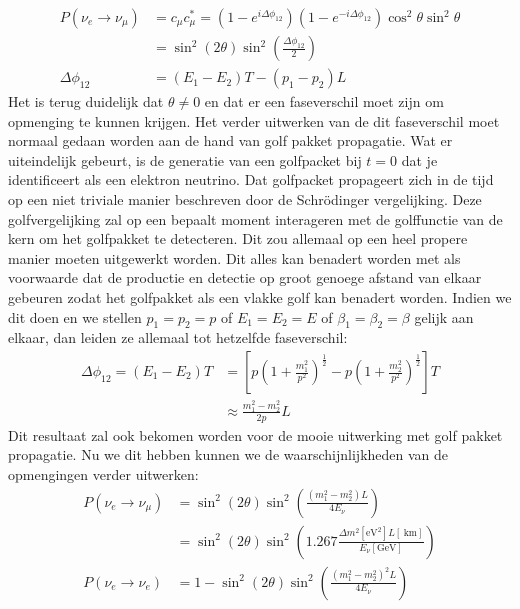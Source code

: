 \documentclass[../main.tex]{subfiles}
\begin{document}
\begin{equation}
    \begin{aligned}
        \label{eq:neutrino_2_oscilaties_5}
        P\left(\nu_{e} \rightarrow \nu_{\mu}\right) &=c_{\mu} c_{\mu}^{*}=\left(1-e^{i \Delta \phi_{12}}\right)\left(1-e^{-i \Delta \phi_{12}}\right) \cos ^{2} \theta \sin ^{2} \theta \\
                                                    &=\sin ^{2}(2 \theta) \sin ^{2}\left(\frac{\Delta \phi_{12}}{2}\right)\\
        \Delta \phi_{12}&=\left(E_{1}-E_{2}\right) T-\left(p_{1}-p_{2}\right) L
    \end{aligned}
\end{equation}
Het is terug duidelijk dat $\theta\neq 0$ en dat er een faseverschil moet zijn om opmenging te kunnen krijgen. Het verder uitwerken van de dit faseverschil moet normaal gedaan worden aan de hand van golf pakket propagatie. Wat er uiteindelijk gebeurt, is de generatie van een golfpacket bij $t=0$ dat je identificeert als een elektron neutrino. Dat golfpacket propageert zich in de tijd op een niet triviale manier beschreven door de Schrödinger vergelijking. Deze golfvergelijking zal op een bepaalt moment interageren met de golffunctie van de kern om het golfpakket te detecteren. Dit zou allemaal op een heel propere manier moeten uitgewerkt worden. Dit alles kan benadert worden met als voorwaarde dat de productie en detectie op groot genoege afstand van elkaar gebeuren zodat het golfpakket als een vlakke golf kan benadert worden. Indien we dit doen en we stellen $p_{1}=p_{2}=p$ of $E_{1}=E_{2}=E$ of $\beta_{1}=\beta_{2}=\beta$ gelijk aan elkaar, dan leiden ze allemaal tot hetzelfde faseverschil:
\begin{equation}
    \begin{aligned}
        \label{eq:neutrino_2_oscilaties_6}
        \Delta \phi_{12}=\left(E_{1}-E_{2}\right) T &=\left[p\left(1+\frac{m_{1}^{2}}{p^{2}}\right)^{\frac{1}{2}}-p\left(1+\frac{m_{2}^{2}}{p^{2}}\right)^{\frac{1}{2}}\right] T \\
                                                    & \approx \frac{m_{1}^{2}-m_{2}^{2}}{2 p} L
    \end{aligned}
\end{equation}
Dit resultaat zal ook bekomen worden voor de mooie uitwerking met golf pakket propagatie. Nu we dit hebben kunnen we de waarschijnlijkheden van de opmengingen verder uitwerken:
\begin{equation}
    \begin{aligned}
        \label{eq:neutrino_2_oscilaties_7}
        P\left(\nu_{e} \rightarrow \nu_{\mu}\right) &=\sin ^{2}(2 \theta) \sin ^{2}\left(\frac{\left(m_{1}^{2}-m_{2}^{2}\right) L}{4 E_{\nu}}\right) \\
                                                    &=\sin ^{2}(2 \theta) \sin ^{2}\left(1.267 \frac{\Delta m^{2}\left[\mathrm{eV}^{2}\right] L[\mathrm{~km}]}{E_{\nu}[\mathrm{GeV}]}\right) \\
        P\left(\nu_{e} \rightarrow \nu_{e}\right) &=1-\sin ^{2}(2 \theta) \sin ^{2}\left(\frac{\left(m_{1}^{2}-m_{2}^{2}\right)^{2} L}{4 E_{\nu}}\right)
    \end{aligned}
\end{equation}
\end{document}
